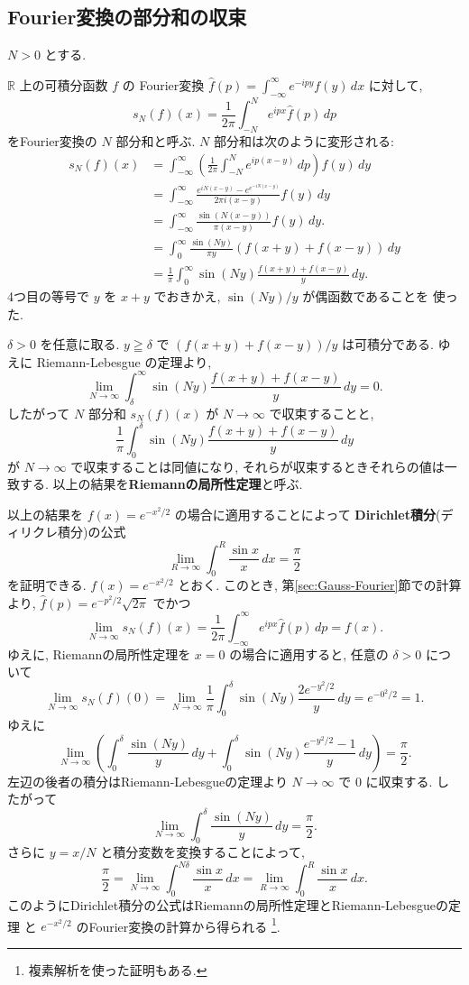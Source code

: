 \documentclass[12pt,twoside]{jarticle}
\newcommand\R{{\mathbb R}} %
\theoremstyle{jplain}
\theoremstyle{jplain}
\theoremstyle{jplain}
\numberwithin{theorem}{section}
\numberwithin{equation}{section}
\numberwithin{figure}{section}
\numberwithin{table}{section}
\newcommand\secref[1]{第\ref{#1}節}
\begin{document}
\subsection{Fourier変換の部分和の収束}
\label{sec:Ftransf-N}

$N>0$ とする.

$\R$ 上の可積分函数 $f$ の
Fourier変換 $\widehat{f}(p)=\int_{-\infty}^\infty e^{-ipy}f(y)\,dx$ に対して, 
\[
s_N(f)(x) = \frac{1}{2\pi}\int_{-N}^N e^{ipx} \widehat{f}(p)\,dp
\]
をFourier変換の $N$ 部分和と呼ぶ. $N$ 部分和は次のように変形される:
\begin{align*}
s_N(f)(x)
&=\int_{-\infty}^\infty
\left(\frac{1}{2\pi}\int_{-N}^N e^{ip(x-y)} \,dp\right) f(y)\,dy
\\ &
=\int_{-\infty}^\infty
\frac{e^{iN(x-y)}-e^{e^{-iN(x-y)}}}{2\pi i(x-y)} f(y)\,dy
\\ &
=\int_{-\infty}^\infty
\frac{\sin(N(x-y))}{\pi(x-y)} f(y)\,dy.
\\ &
=\int_0^\infty
\frac{\sin(Ny)}{\pi y} (f(x+y)+f(x-y))\,dy
\\ &
=\frac{1}{\pi}\int_0^\infty
\sin(Ny) \frac{f(x+y)+f(x-y)}{y} \,dy.
\end{align*}
4つ目の等号で $y$ を $x+y$ でおきかえ, $\sin(Ny)/y$ が偶函数であることを
使った. 

$\delta>0$ を任意に取る.
$y\geqq \delta$ で $(f(x+y)+f(x-y))/y$ は可積分である.
ゆえに Riemann-Lebesgue の定理より,
\[
\lim_{N\to\infty}
\int_\delta^\infty
\sin(Ny) \frac{f(x+y)+f(x-y)}{y} \,dy
= 0.
\]
したがって $N$ 部分和 $s_N(f)(x)$ が $N\to\infty$ で収束することと, 
\[
\frac{1}{\pi}\int_0^\delta
\sin(Ny) \frac{f(x+y)+f(x-y)}{y} \,dy
\]
が $N\to\infty$ で収束することは同値になり, 
それらが収束するときそれらの値は一致する.
以上の結果を{\bf Riemannの局所性定理}と呼ぶ.

以上の結果を $f(x)=e^{-x^2/2}$ の場合に適用することによって
{\bf Dirichlet積分}(ディリクレ積分)の公式
\[
\lim_{R\to\infty}\int_0^R \frac{\sin x}{x}\,dx = \frac{\pi}{2}
\]
を証明できる. $f(x)=e^{-x^2/2}$ とおく.
このとき, \secref{sec:Gauss-Fourier}での計算より,
$\widehat{f}(p)=e^{-p^2/2}\sqrt{2\pi}$ でかつ
\[
\lim_{N\to\infty}s_N(f)(x)
= \frac{1}{2\pi}\int_{-\infty}^\infty e^{ipx}\widehat{f}(p)\,dp
= f(x).
\]
ゆえに, Riemannの局所性定理を $x=0$ の場合に適用すると,
任意の $\delta>0$ について
\[
\lim_{N\to\infty}s_N(f)(0)
=\lim_{N\to\infty}
\frac{1}{\pi}\int_0^\delta \sin(Ny)\frac{2e^{-y^2/2}}{y}\,dy
=e^{-0^2/2}=1.
\] 
ゆえに
\[
\lim_{N\to\infty}
\left(
 \int_0^\delta \frac{\sin(Ny)}{y}\,dy
 + \int_0^\delta \sin(Ny)\frac{e^{-y^2/2}-1}{y}\,dy
\right)
=\frac{\pi}{2}.
\]
左辺の後者の積分はRiemann-Lebesgueの定理より $N\to\infty$ で $0$ に収束する.
したがって
\[
\lim_{N\to\infty}\int_0^\delta \frac{\sin(Ny)}{y}\,dy = \frac{\pi}{2}.
\]
さらに $y=x/N$ と積分変数を変換することによって,
\[
\frac{\pi}{2}
=\lim_{N\to\infty}\int_0^{N\delta} \frac{\sin x}{x}\,dx
= \lim_{R\to\infty}\int_0^R \frac{\sin x}{x}\,dx.
\]
このようにDirichlet積分の公式はRiemannの局所性定理とRiemann-Lebesgueの定理
と $e^{-x^2/2}$ のFourier変換の計算から得られる%
\footnote{複素解析を使った証明もある.}.
\end{document}
